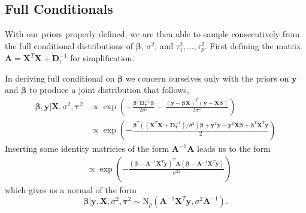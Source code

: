 \documentclass{uwstat572}
\begin{document}
\subsection{Full Conditionals}
With our priors properly defined, we are then able to sample consecutively from the full conditional distributions of $\boldsymbol\beta$, $\sigma^2$, and $\tau^2_1,...,\tau^2_p$. First defining the matrix $\mathbf{A}=\mathbf{X}^T\mathbf{X}+\mathbf{D}_\tau^{-1}$ for simplification.

In deriving full conditional on $\boldsymbol\beta$ we concern ourselves only with the priors on $\mathbf{y}$ and $\boldsymbol\beta$ to produce a joint distribution that follows,\begin{align*}
\boldsymbol\beta,\mathbf{y}|\mathbf{X},\sigma^2,\boldsymbol\tau^2 &\propto \exp{\left(-\frac{\boldsymbol\beta^T\mathbf{D}_{\boldsymbol\tau}^{-1}\boldsymbol\beta}{2\sigma^2}-\frac{(\mathbf{y}-\boldsymbol\beta\mathbf{X})^T(\mathbf{y}-\mathbf{X}\boldsymbol\beta)}{2\sigma^2}\right)}\\
&\propto \exp{\left(-\frac{\boldsymbol\beta^T((\mathbf{X}^T\mathbf{X}+\mathbf{D}_{\boldsymbol\tau}^{-1})/\sigma^2)\boldsymbol\beta+\mathbf{y}^T\mathbf{y}-\mathbf{y}^T\mathbf{X}\boldsymbol\beta+\boldsymbol\beta^T\mathbf{X}^T\mathbf{y}}{2}\right)}
\end{align*}
Inserting some identity matricies of the form $\mathbf{A}^{-1}\mathbf{A}$ leads us to the form
\begin{align*}
&\propto \exp{\left(-\frac{(\boldsymbol\beta-\mathbf{A}^{-1}\mathbf{X}^T\mathbf{y})^T\mathbf{A}(\boldsymbol\beta-\mathbf{A}^{-1}\mathbf{X}^T\mathbf{y})}{\sigma^22}\right)}
\end{align*}
which gives us a normal of the form
\[
\boldsymbol\beta|\mathbf{y},\mathbf{X},\sigma^2,\boldsymbol\tau^2 \sim \text{N}_p(\mathbf{A}^{-1}\mathbf{X}^T\mathbf{y},\sigma^2\mathbf{A}^{-1}). \] 
\end{document}
